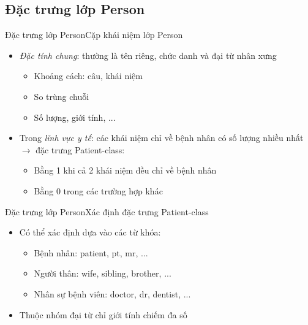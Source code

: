 \subsection*{Đặc trưng lớp Person}
\begin{frame}{Đặc trưng lớp Person}{Cặp khái niệm lớp Person}
\putlogo
\begin{itemize}
	\item \emph{Đặc tính chung}: thường là tên riêng, chức danh và đại từ nhân xưng
	\begin{itemize}
		\item Khoảng cách: câu, khái niệm
		\item So trùng chuỗi
		\item Số lượng, giới tính, ...
	\end{itemize}
	\item Trong \emph{lĩnh vực y tế}: các khái niệm chỉ về bệnh nhân có số lượng nhiều nhất $\rightarrow$ đặc trưng Patient-class:
	\begin{itemize}
		\item Bằng 1 khi cả 2 khái niệm đều chỉ về bệnh nhân
		\item Bằng 0 trong các trường hợp khác
	\end{itemize}

\end{itemize}
\end{frame}

\begin{frame}{Đặc trưng lớp Person}{Xác định đặc trưng Patient-class}
\putlogo
\begin{itemize}
	\item Có thể xác định dựa vào các {\color{red} từ khóa:}
	\begin{itemize}
		\item Bệnh nhân: patient, pt, mr, ...
		\item Người thân: wife, sibling, brother, ...
		\item Nhân sự bệnh viên: doctor, dr, dentist, ...
	\end{itemize}
	\item Thuộc nhóm đại từ chỉ giới tính chiếm đa số
\end{itemize}
\end{frame}

